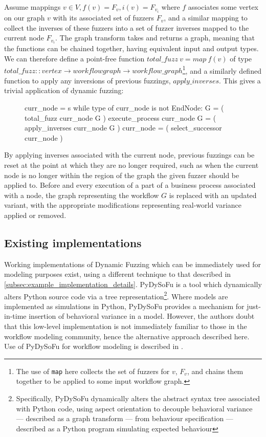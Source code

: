 \documentclass[12pt]{llncs}  %
\begin{document}
Assume mappings \(v \in V, f(v)=F_v, i(v)=F_{v_i}\) where $f$ associates some
vertex on our graph $v$ with its associated set of fuzzers $F_v$, and a similar
mapping to collect the inverses of these fuzzers into a set of fuzzer inverses
mapped to the current node $F_{v_i}$. The graph transform takes and returns a
graph, meaning that the functions can be chained together, having equivalent
input and output types. We can therefore define a point-free function
$total\_fuzz~v = map~f(v)$ of type $total\_fuzz :: vertex \rightarrow workflow
graph \rightarrow workflow\_graph$\footnote{The use of \texttt{map} here
  collects the set of fuzzers for $v$, $F_v$, and chains them together to be
  applied to some input workflow graph.}, and a similarly defined function to
apply any inversions of previous fuzzings, $apply\_inverses$. This gives a
trivial application of dynamic fuzzing:

\begin{figure}[H]
  \begin{algorithm}
    curr_node = s while type of curr_node is not EndNode: G = ( total_fuzz
    curr_node G ) execute_process curr_node G = ( apply_inverses curr_node G )
    curr_node = ( select_successor curr_node )
  \end{algorithm}
\end{figure}
By applying inverses associated with the current node, previous fuzzings can be
reset at the point at which they are no longer required, such as when the
current node is no longer within the region of the graph the given fuzzer should
be applied to. Before and every execution of a part of a business process
associated with a node, the graph representing the workflow $G$ is replaced with
an updated variant, with the appropriate modifications representing real-world
variance applied or removed.
\par

\subsection{Existing implementations}
Working implementations of Dynamic Fuzzing which can be immediately used for
modeling purposes exist, using a different technique to that described in
\cref{subsec:example_implementation_details}. PyDySoFu\citep{pdsf} is a tool
which dynamically alters Python source code via a tree
representation\footnote{Specifically, PyDySoFu dynamically alters the abstract
  syntax tree associated with Python code, using aspect orientation to decouple
  behavioral variance --- described as a graph transform --- from behaviour
  specification --- described as a Python program simulating expected
  behaviour}. Where models are implemented as simulations in Python, PyDySoFu
provides a mechanism for just-in-time insertion of behavioral variance in a
model. However, the authors doubt that this low-level implementation is not
immediately familiar to those in the workflow modeling community, hence the
alternative approach described here. Use of PyDySoFu for workflow modeling is
described in \cite{wallis2018modelling}.
\par
\end{document}
